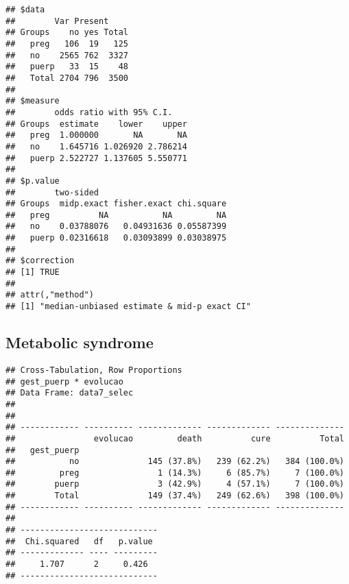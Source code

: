 \documentclass[
]{article}
\newenvironment{Shaded}{\begin{snugshade}}{\end{snugshade}}
\newcommand{\DataTypeTok}[1]{\textcolor[rgb]{0.13,0.29,0.53}{#1}}
\newcommand{\KeywordTok}[1]{\textcolor[rgb]{0.13,0.29,0.53}{\textbf{#1}}}
\newcommand{\NormalTok}[1]{#1}
\newcommand{\OperatorTok}[1]{\textcolor[rgb]{0.81,0.36,0.00}{\textbf{#1}}}
\newcommand{\OtherTok}[1]{\textcolor[rgb]{0.56,0.35,0.01}{#1}}
\newcommand{\StringTok}[1]{\textcolor[rgb]{0.31,0.60,0.02}{#1}}
\begin{document}
\begin{verbatim}
## $data
##        Var Present
## Groups    no yes Total
##   preg   106  19   125
##   no    2565 762  3327
##   puerp   33  15    48
##   Total 2704 796  3500
## 
## $measure
##        odds ratio with 95% C.I.
## Groups  estimate    lower    upper
##   preg  1.000000       NA       NA
##   no    1.645716 1.026920 2.786214
##   puerp 2.522727 1.137605 5.550771
## 
## $p.value
##        two-sided
## Groups  midp.exact fisher.exact chi.square
##   preg          NA           NA         NA
##   no    0.03788076   0.04931636 0.05587399
##   puerp 0.02316618   0.03093899 0.03038975
## 
## $correction
## [1] TRUE
## 
## attr(,"method")
## [1] "median-unbiased estimate & mid-p exact CI"
\end{verbatim}

\hypertarget{metabolic-syndrome}{%
\subsection{Metabolic syndrome}\label{metabolic-syndrome}}

\begin{Shaded}
\end{Shaded}

\begin{Shaded}
\end{Shaded}

\begin{verbatim}
## Cross-Tabulation, Row Proportions  
## gest_puerp * evolucao  
## Data Frame: data7_selec  
## 
## 
## ------------ ---------- ------------- ------------- --------------
##                evolucao         death          cure          Total
##   gest_puerp                                                      
##           no              145 (37.8%)   239 (62.2%)   384 (100.0%)
##         preg                1 (14.3%)     6 (85.7%)     7 (100.0%)
##        puerp                3 (42.9%)     4 (57.1%)     7 (100.0%)
##        Total              149 (37.4%)   249 (62.6%)   398 (100.0%)
## ------------ ---------- ------------- ------------- --------------
## 
## ----------------------------
##  Chi.squared   df   p.value 
## ------------- ---- ---------
##     1.707      2     0.426  
## ----------------------------
\end{verbatim}
\end{document}
